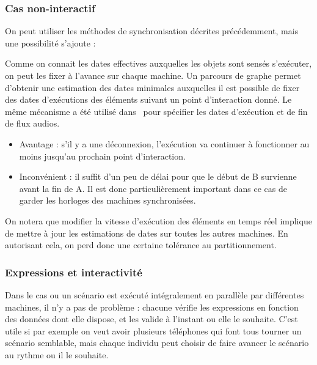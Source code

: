 \documentclass{article}
\newcommand\trigger{point d'interaction\xspace}
\begin{document}
\subsubsection{Cas non-interactif}
On peut utiliser les méthodes de synchronisation décrites précédemment, mais une possibilité s'ajoute : 

Comme on connait les dates effectives auxquelles les objets sont sensés s'exécuter, on peut les fixer à l'avance sur chaque machine. 
Un parcours de graphe permet d'obtenir une estimation des dates minimales auxquelles il est possible de fixer des dates d'exécutions des éléments suivant un point d'interaction donné.
Le même mécanisme a été utilisé dans~\cite{celerier2016rethinking} pour spécifier les dates d'exécution et de fin de flux audios.


\begin{itemize}
\item Avantage : s'il y a une déconnexion, l'exécution va continuer à fonctionner au moins jusqu'au prochain \trigger.
\item Inconvénient : il suffit d'un peu de délai pour que le début de B survienne avant la fin de A. 
Il est donc particulièrement important dans ce cas de garder les horloges des machines synchronisées.
\end{itemize}

On notera que modifier la vitesse d'exécution des éléments en temps réel implique de mettre à jour les estimations de dates sur toutes les autres machines. 
En autorisant cela, on perd donc une certaine tolérance au partitionnement.

\begin{figure}[h]
	\centering
	\begin{tikzpicture}
	
	\end{tikzpicture}
	\label{scenar.non-interactif}
\end{figure}


\subsubsection{Expressions et interactivité}
Dans le cas ou un scénario est exécuté intégralement en parallèle par différentes machines, il n'y a pas de problème : chacune vérifie les expressions en fonction des données dont elle dispose, et les valide à l'instant ou elle le souhaite. C'est utile si par exemple on veut avoir plusieurs téléphones qui font tous tourner un scénario semblable, mais chaque individu peut choisir de faire avancer le scénario au rythme ou il le souhaite.
\end{document}
